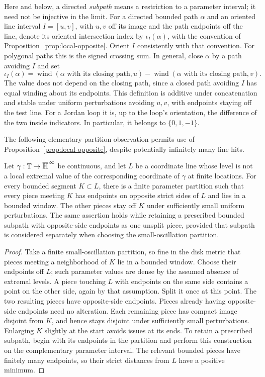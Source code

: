 Here and below, a directed \emph{subpath} means a restriction to a parameter interval; it need not be injective in the limit. For a directed bounded path $\alpha$ and an oriented line interval $I=[u,v]$, with $u,v$ off its image and the path endpoints off the line, denote its oriented intersection index by $\iota_I(\alpha)$, with the convention of Proposition~\ref{prop:local-opposite}. Orient $I$ consistently with that convention. For polygonal paths this is the signed crossing sum. In general, close $\alpha$ by a path avoiding $I$ and set
\[
 \iota_I(\alpha)=\operatorname{wind}(\alpha\text{ with its closing path},u)
             -\operatorname{wind}(\alpha\text{ with its closing path},v).
\]
The value does not depend on the closing path, since a closed path avoiding $I$ has equal winding about its endpoints. This definition is additive under concatenation and stable under uniform perturbations avoiding $u,v$, with endpoints staying off the test line. For a Jordan loop it is, up to the loop's orientation, the difference of the two inside indicators. In particular, it belongs to $\{0,1,-1\}$.

The following elementary partition observation permits use of Proposition~\ref{prop:local-opposite}, despite potentially infinitely many line hits.

\begin{lemma}\label{lem:opposite-partition}
Let $\gamma:\mathbb T\to\overline{\mathbb H}^{\,\infty}$ be continuous, and let $L$ be a coordinate line whose level is not a local extremal value of the corresponding coordinate of $\gamma$ at finite locations. For every bounded segment $K\subset L$, there is a finite parameter partition such that every piece meeting $K$ has endpoints on opposite strict sides of $L$ and lies in a bounded window. The other pieces stay off $K$ under sufficiently small uniform perturbations. The same assertion holds while retaining a prescribed bounded subpath with opposite-side endpoints as one unsplit piece, provided that subpath is considered separately when choosing the small-oscillation partition.
\end{lemma}

\begin{proof}
Take a finite small-oscillation partition, so fine in the disk metric that pieces meeting a neighborhood of $K$ lie in a bounded window. Choose their endpoints off $L$; such parameter values are dense by the assumed absence of extremal levels. A piece touching $L$ with endpoints on the same side contains a point on the other side, again by that assumption. Split it once at this point. The two resulting pieces have opposite-side endpoints. Pieces already having opposite-side endpoints need no alteration. Each remaining piece has compact image disjoint from $K$, and hence stays disjoint under sufficiently small perturbations. Enlarging $K$ slightly at the start avoids issues at its ends. To retain a prescribed subpath, begin with its endpoints in the partition and perform this construction on the complementary parameter interval. The relevant bounded pieces have finitely many endpoints, so their strict distances from $L$ have a positive minimum.
\end{proof}

